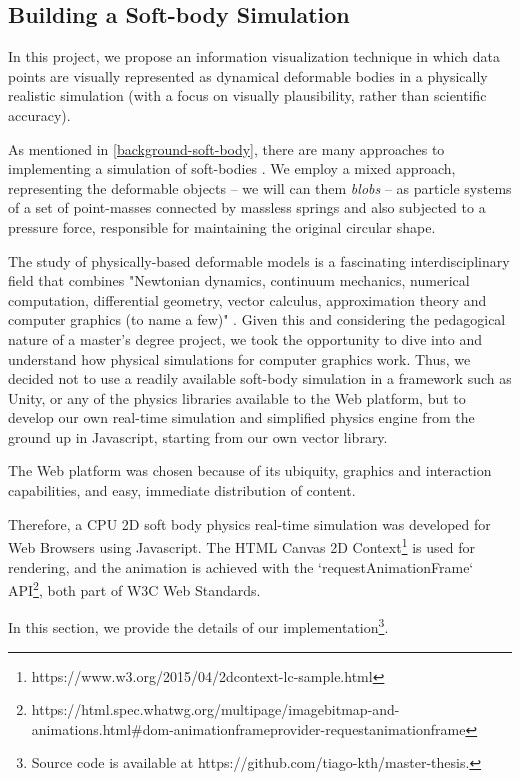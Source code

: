 \documentclass[manuscript, screen]{timtm}
\begin{document}
\subsection{Building a Soft-body Simulation}

In this project, we propose an information visualization technique in which data points are visually represented as dynamical deformable bodies in a physically realistic simulation (with a focus on visually plausibility, rather than scientific accuracy).

As mentioned in \ref{background-soft-body}, there are many approaches to implementing a simulation of soft-bodies \cite{NealenAndrew2006PBDM, book-deformable-objects}. We employ a mixed approach, representing the deformable objects -- we will can them \textit{blobs} -- as particle systems of a set of point-masses connected by massless springs and also subjected to a pressure force, responsible for maintaining the original circular shape.

The study of physically-based deformable models is a fascinating interdisciplinary field that combines "Newtonian dynamics, continuum mechanics, numerical computation, differential geometry, vector calculus, approximation theory and computer graphics (to name a few)" \cite{NealenAndrew2006PBDM}. Given this and considering the pedagogical nature of a master's degree project, we took the opportunity to dive into and understand how physical simulations for computer graphics work. Thus, we decided not to use a readily available soft-body simulation in a framework such as Unity, or any of the physics libraries available to the Web platform, but to develop our own real-time simulation and simplified physics engine from the ground up in Javascript, starting from our own vector library.

The Web platform was chosen because of its ubiquity, graphics and interaction capabilities, and easy, immediate distribution of content.

Therefore, a CPU 2D soft body physics real-time simulation was developed for Web Browsers using Javascript. The HTML Canvas 2D Context\footnote{https://www.w3.org/2015/04/2dcontext-lc-sample.html} is used for rendering, and the animation is achieved with the `requestAnimationFrame` API\footnote{https://html.spec.whatwg.org/multipage/imagebitmap-and-animations.html\#dom-animationframeprovider-requestanimationframe}, both part of W3C Web Standards.

In this section, we provide the details of our implementation\footnote{Source code is available at https://github.com/tiago-kth/master-thesis.}.
\end{document}
